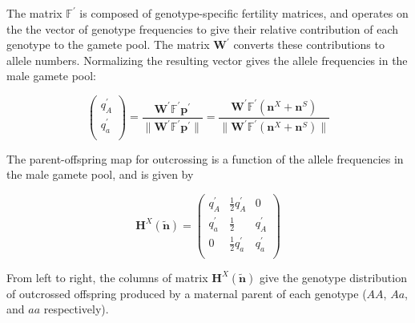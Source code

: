 \documentclass[11pt]{article}
\def\mbf#1{\mathbf{#1}}
\def\mbb#1{\mathbb{#1}}
\begin{document}
\noindent The matrix $\mbb{F}^{\prime}$ is composed of genotype-specific fertility matrices, and operates on the the vector of genotype frequencies to give their relative contribution of each genotype to the gamete pool. The matrix $\mbf{W}^{\prime}$ converts these contributions to allele numbers. Normalizing the resulting vector gives the allele frequencies in the male gamete pool:
\begin{linenomath*}
\begin{equation} \label{eq:maleGametePool}
	\left(
		\begin{array}{c}
			q^{\prime}_{A} \\
			q^{\prime}_{a} \\
		\end{array} \right) = 
			\frac{\mbf{W}^{\prime} \mbb{F}^{\prime} \mbf{p}^{\prime}}{\| \mbf{W}^{\prime} \mbb{F}^{\prime} \mbf{p}^{\prime} \|} = 
				\frac{\mbf{W}^{\prime} \mbb{F}^{\prime} (\mbf{n}^X + \mbf{n}^S)}{\| \mbf{W}^{\prime} \mbb{F}^{\prime} (\mbf{n}^X + \mbf{n}^S)\|}
\end{equation}
\end{linenomath*}

The parent-offspring map for outcrossing is a function of the allele frequencies in the male gamete pool, and is given by 
\begin{linenomath*}
\begin{equation} \label{eq:HX}
	\mbf{H}^X(\tilde{\mbf{n}}) = 
			\left(
			\begin{array}{ccc}
				q^{\prime}_{A} & \frac{1}{2} q^{\prime}_{A} & 0 \\
				q^{\prime}_{a} & \frac{1}{2} & q^{\prime}_{A}  \\
				0 & \frac{1}{2} q^{\prime}_{a} & q^{\prime}_{a} \\
			\end{array} \right)
\end{equation}
\end{linenomath*}

\noindent From left to right, the columns of matrix $\mbf{H}^X(\tilde{\mbf{n}})$ give the genotype distribution of outcrossed offspring produced by a maternal parent of each genotype ($AA$, $Aa$, and $aa$ respectively).
\end{document}
